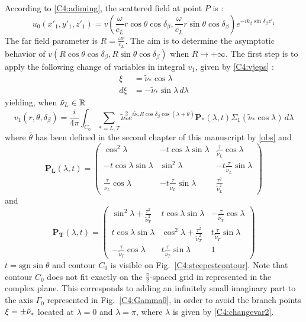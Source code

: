 According to \eqref{C4:adiming}, the scattered field at point $P$ is :
\begin{equation}
u_0(x'_1,y'_1,z'_1)=v(\frac{\omega}{c_L}r\cos\theta\cos\delta_{\beta},\frac{\omega}{c_L}r\sin\theta\cos\delta_{\beta})e^{-ik_{\beta}\sin\delta_{\beta}z'_1}
\end{equation}
The far field parameter is $R=\frac{\omega r}{c_L}$. The aim is to determine the asymptotic behavior of $v(R\cos\theta\cos\delta_{\beta},R\sin\theta\cos\delta_{\beta})$ when $R\rightarrow +\infty$. The first step is to apply the following change of variables in integral $v_1$, given by \eqref{C4:vjeps} :
\begin{equation}
\begin{split}
\xi&=\tilde{\nu}_*\cos\lambda \\
d\xi&=-\tilde{\nu}_*\sin\lambda\, d\lambda
\end{split}
\label{C4:changevar2}
\end{equation}
yielding, when $\tilde{\nu}_L \in \mathbb{R}$
\begin{equation}
v_1(r,\theta,\delta_{\beta})=\frac{i}{4\pi} \int_{C_0}\sum_{*=L,T}\tilde{\nu}_*^2 e^{i\tilde{\nu}_*R\cos\delta_{\beta}\cos(\lambda+\bar{\theta})}\mathbf{ P_*}(\lambda,t)\Sigma_1(\tilde{\nu}_*\cos\lambda) \, d \lambda
\label{C4:v1C0}
\end{equation}
where $\bar{\theta}$ has been defined in the second chapter of this manuscript by \eqref{obs} and
\begin{equation}
\mathbf{P_L}(\lambda,t)=
\begin{pmatrix}
\cos^2\lambda & -t\cos\lambda\sin\lambda &\frac{\tau}{\tilde{\nu}_L} \cos\lambda \\
-t\cos\lambda\sin\lambda & \sin^2\lambda&-t\frac{\tau}{\tilde{\nu}_L}\sin\lambda \\
\frac{\tau}{\tilde{\nu}_L} \cos\lambda&-t\frac{\tau}{\tilde{\nu}_L}\sin\lambda&\frac{\tau^2}{\tilde{\nu}_L^2}
\end{pmatrix}
\end{equation}
and
\begin{equation}
\mathbf{P_T}(\lambda,t)=
\begin{pmatrix}
\sin^2\lambda+\frac{\tau^2}{\tilde{\nu}_T^2} & t\cos\lambda\sin\lambda &-\frac{\tau}{\tilde{\nu}_T}\cos\lambda \\
t\cos\lambda\sin\lambda & \cos^2\lambda+\frac{\tau^2}{\tilde{\nu}_T^2}&t\frac{\tau}{\tilde{\nu}_T}\sin\lambda \\
-\frac{\tau}{\tilde{\nu}_T}\cos\lambda&t\frac{\tau}{\tilde{\nu}_T}\sin\lambda&1
\end{pmatrix}
\end{equation}
$t=\mbox{sgn} \sin\theta$ and contour $C_0$ is visible on Fig.~\ref{C4:steepestcontour}. Note that contour $C_0$ does not fit exactly on the $\frac{\pi}{2}$-spaced grid in represented in the complex plane. This corresponds to adding an infinitely small imaginary part to the axis $\Gamma_0$ represented in Fig.~\ref{C4:Gamma0}, in order to avoid the branch points $\xi=\pm \tilde{\nu}_*$ located at $\lambda=0$ and $\lambda=\pi$, where $\lambda$ is given by \eqref{C4:changevar2}.

